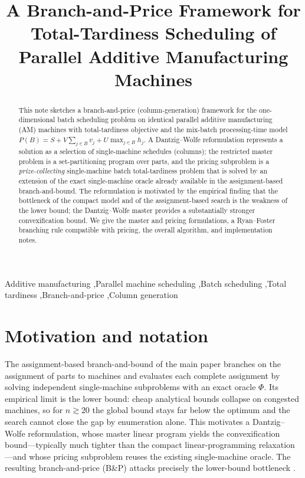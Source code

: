 \documentclass[review,3p,times,authoryear]{elsarticle}
\begin{document}
\begin{frontmatter}
\title{A Branch-and-Price Framework for Total-Tardiness Scheduling of\\
Parallel Additive Manufacturing Machines}
\begin{abstract}
This note sketches a branch-and-price (column-generation) framework for the
one-dimensional batch scheduling problem on identical parallel additive
manufacturing (AM) machines with total-tardiness objective and the mix-batch
processing-time model $P(B)=S+V\sum_{j\in B}v_j+U\max_{j\in B}h_j$. A
Dantzig--Wolfe reformulation represents a solution as a selection of
single-machine schedules (columns); the restricted master problem is a
set-partitioning program over parts, and the pricing subproblem is a
\emph{prize-collecting} single-machine batch total-tardiness problem that is
solved by an extension of the exact single-machine oracle already available in
the assignment-based branch-and-bound. The reformulation is motivated by the
empirical finding that the bottleneck of the compact model and of the
assignment-based search is the weakness of the lower bound; the Dantzig--Wolfe
master provides a substantially stronger convexification bound. We give the
master and pricing formulations, a Ryan--Foster branching rule compatible with
pricing, the overall algorithm, and implementation notes.
\end{abstract}
\begin{keyword}
Additive manufacturing \sep Parallel machine scheduling \sep Batch scheduling
\sep Total tardiness \sep Branch-and-price \sep Column generation
\end{keyword}
\end{frontmatter}

\section{Motivation and notation}
\label{sec:bp_motivation}

The assignment-based branch-and-bound of the main paper branches on the
assignment of parts to machines and evaluates each complete assignment by
solving independent single-machine subproblems with an exact oracle $\Phi$. Its
empirical limit is the lower bound: cheap analytical bounds collapse on
congested machines, so for $n\gtrsim 20$ the global bound stays far below the
optimum and the search cannot close the gap by enumeration alone. This motivates
a Dantzig--Wolfe reformulation, whose master linear program yields the
convexification bound---typically much tighter than the compact
linear-programming relaxation---and whose pricing subproblem reuses the existing
single-machine oracle. The resulting branch-and-price (B\&P) attacks precisely
the lower-bound bottleneck \citep{barnhart1998,desaulniers2005}.
\end{document}
